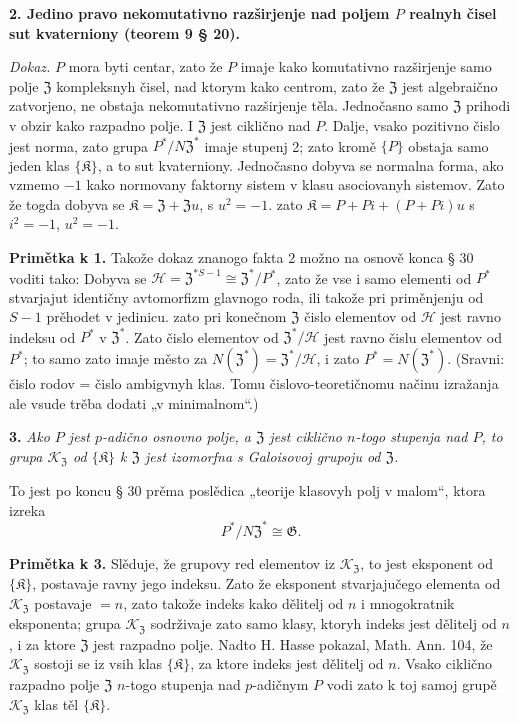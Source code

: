 \documentclass[11pt]{article}
\begin{document}
\noindent\textbf{2. Jedino pravo nekomutativno razširjenje nad poljem \(P\) realnyh čisel sut kvaterniony (teorem 9 § 20).}

\noindent\emph{Dokaz.} \(P\) mora byti centar, zato že \(P\) imaje kako komutativno razširjenje samo polje \(\mathfrak Z\) kompleksnyh čisel, nad ktorym kako centrom, zato že \(\mathfrak Z\) jest algebraično zatvorjeno, ne obstaja nekomutativno razširjenje těla. Jednočasno samo \(\mathfrak Z\) prihodi v obzir kako razpadno polje. I \(\mathfrak Z\) jest ciklično nad \(P\). Dalje, vsako pozitivno čislo jest norma, zato grupa \(P^*/N\mathfrak Z^*\) imaje stupenj 2; zato kromě \(\{P\}\) obstaja samo jeden klas \(\{\mathfrak K\}\), a to sut kvaterniony. Jednočasno dobyva se normalna forma, ako vzmemo \(-1\) kako normovany faktorny sistem v klasu asociovanyh sistemov. Zato že togda dobyva se \(\mathfrak K=\mathfrak Z+\mathfrak Zu\), s \(u^2=-1\). zato \(\mathfrak K=P+Pi+(P+Pi)u\) s \(i^2=-1\), \(u^2=-1\).

\noindent\textbf{Primětka k 1.} Takože dokaz znanogo fakta 2 možno na osnově konca § 30 voditi tako: Dobyva se \(\mathscr H=\mathfrak Z^{*S-1}\cong\mathfrak Z^*/P^*\), zato že vse i samo elementi od \(P^*\) stvarjajut identičny avtomorfizm glavnogo roda, ili takože pri priměnjenju od \(S-1\) prěhodet v jedinicu. zato pri konečnom \(\mathfrak Z\) čislo elementov od \(\mathscr H\) jest ravno indeksu od \(P^*\) v \(\mathfrak Z^*\). Zato čislo elementov od \(\mathfrak Z^*/\mathscr H\) jest ravno čislu elementov od \(P^*\); to samo zato imaje město za \(N(\mathfrak Z^*)=\mathfrak Z^*/\mathscr H\), i zato \(P^*=N(\mathfrak Z^*)\). (Sravni: čislo rodov = čislo ambigvnyh klas. Tomu čislovo-teoretičnomu načinu izražanja ale vsude trěba dodati „v minimalnom“.)

\noindent\textbf{3.} \emph{Ako \(P\) jest \(p\)-adično osnovno polje, a \(\mathfrak Z\) jest ciklično \(n\)-togo stupenja nad \(P\), to grupa \(\mathscr K_{\mathfrak Z}\) od \(\{\mathfrak K\}\) k \(\mathfrak Z\) jest izomorfna s Galoisovoj grupoju od \(\mathfrak Z\).}

To jest po koncu § 30 prěma poslědica „teorije klasovyh polj v malom“, ktora izreka
\[
P^*/N\mathfrak Z^*\cong\mathfrak G.
\]

\noindent\textbf{Primětka k 3.} Slěduje, že grupovy red elementov iz \(\mathscr K_{\mathfrak Z}\), to jest eksponent od \(\{\mathfrak K\}\), postavaje ravny jego indeksu. Zato že eksponent stvarjajučego elementa od \(\mathscr K_{\mathfrak Z}\) postavaje \(=n\), zato takože indeks kako dělitelj od \(n\) i mnogokratnik eksponenta; grupa \(\mathscr K_{\mathfrak Z}\) sodrživaje zato samo klasy, ktoryh indeks jest dělitelj od \(n\), i za ktore \(\mathfrak Z\) jest razpadno polje. Nadto H. Hasse pokazal, Math. Ann. 104, že \(\mathscr K_{\mathfrak Z}\) sostoji se iz vsih klas \(\{\mathfrak K\}\), za ktore indeks jest dělitelj od \(n\). Vsako ciklično razpadno polje \(\mathfrak Z\) \(n\)-togo stupenja nad \(p\)-adičnym \(P\) vodi zato k toj samoj grupě \(\mathscr K_{\mathfrak Z}\) klas těl \(\{\mathfrak K\}\).
\end{document}

